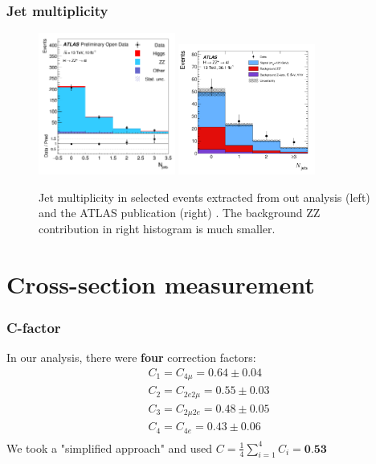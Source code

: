 \documentclass[aspectratio=1610, english]{beamer}
\begin{document}
\begin{frame}
\frametitle{Jet multiplicity}

\begin{figure} [H]
\centering
\includegraphics[width=0.4\textwidth]{hist_n_jets.png}
\includegraphics[width=0.4\textwidth]{hist_n_jets_pub.png}
\caption{ Jet multiplicity in selected events extracted from out analysis (left) and the ATLAS publication (right) \cite{hzz}. The background ZZ contribution in right histogram is much smaller.}
\end{figure}

\end{frame}


\section{Cross-section measurement}

\begin{frame}
\frametitle{C-factor}
In our analysis, there were \textbf{four} correction factors:
\begin{eqnarray}
C_1=C_{4\mu}=0.64 \pm 0.04 \nonumber \\
C_2=C_{2e2\mu}=0.55 \pm 0.03 \nonumber \\
C_3=C_{2\mu2e}=0.48 \pm 0.05 \nonumber \\
C_4=C_{4e}=0.43 \pm 0.06 \nonumber \\
\end{eqnarray}
\vspace{1cm}
We took a "simplified approach" and used $C=\frac{1}{4}\sum_{i=1}^{4} C_i=\textbf{0.53}$
\end{frame}
\end{document}
